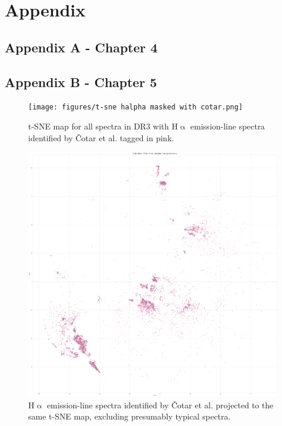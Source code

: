 \chapter{Appendix}

\section{Appendix A - Chapter 4}

\section{Appendix B - Chapter 5}

\begin{figure}[t]
\centering
\texttt{[image: figures/t-sne halpha masked with cotar.png]}
\caption{t-SNE map for all spectra in DR3 with H$\upalpha$ emission-line spectra identified by Čotar et al. tagged in pink.}
\label{fig5.3}
\end{figure}

\begin{figure}[t]
\centering
\includegraphics[scale=0.12]{figures/tsne_cotar_only.png}
\caption{H$\upalpha$ emission-line spectra identified by Čotar et al. projected to the same t-SNE map, excluding presumably typical spectra.}
\label{fig5.3}
\end{figure}

